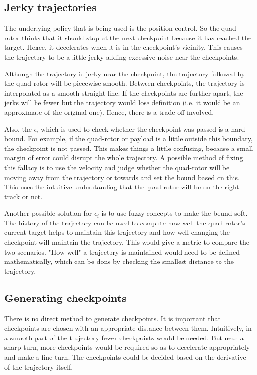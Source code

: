 \documentclass[hidelinks,BTech]{iitmdiss}
\begin{document}
\subsection{Jerky trajectories}
The underlying policy that is being used is the position control. So the quad-rotor thinks that it should stop at the next checkpoint because it has reached the target. Hence, it decelerates when it is in the checkpoint's vicinity. This causes the trajectory to be a little jerky adding excessive noise near the checkpoints.

Although the trajectory is jerky near the checkpoint, the trajectory followed by the quad-rotor will be piecewise smooth. Between checkpoints, the trajectory is interpolated as a smooth straight line. If the checkpoints are further apart, the jerks will be fewer but the trajectory would lose definition (i.e. it would be an approximate of the original one). Hence, there is a trade-off involved.

Also, the $\epsilon_i$ which is used to check whether the checkpoint was passed is a hard bound. For example, if the quad-rotor or payload is a little outside this boundary, the checkpoint is not passed. This makes things a little confusing, because a small margin of error could disrupt the whole trajectory. A possible method of fixing this fallacy is to use the velocity and judge whether the quad-rotor will be moving away from the trajectory or towards and set the bound based on this. This uses the intuitive understanding that the quad-rotor will be on the right track or not.

Another possible solution for $\epsilon_i$ is to use fuzzy concepts to make the bound soft. The history of the trajectory can be used to compute how well the quad-rotor's current target helps to maintain this trajectory and how well changing the checkpoint will maintain the trajectory. This would give a metric to compare the two scenarios. "How well" a trajectory is maintained would need to be defined mathematically, which can be done by checking the smallest distance to the trajectory.

\subsection{Generating checkpoints}
There is no direct method to generate checkpoints. It is important that checkpoints are chosen with an appropriate distance between them. Intuitively, in a smooth part of the trajectory fewer checkpoints would be needed. But near a sharp turn, more checkpoints would be required so as to decelerate appropriately and make a fine turn. The checkpoints could be decided based on the derivative of the trajectory itself.
\end{document}
